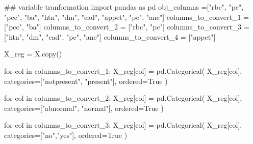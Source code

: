 \documentclass[
  11pt,
  letterpaper,
  DIV=11,
  numbers=noendperiod]{scrartcl}
\newenvironment{Shaded}{\begin{snugshade}}{\end{snugshade}}
\newcommand{\CommentTok}[1]{\textcolor[rgb]{0.37,0.37,0.37}{#1}}
\newcommand{\ControlFlowTok}[1]{\textcolor[rgb]{0.00,0.23,0.31}{#1}}
\newcommand{\ImportTok}[1]{\textcolor[rgb]{0.00,0.46,0.62}{#1}}
\newcommand{\KeywordTok}[1]{\textcolor[rgb]{0.00,0.23,0.31}{#1}}
\newcommand{\NormalTok}[1]{\textcolor[rgb]{0.00,0.23,0.31}{#1}}
\newcommand{\OperatorTok}[1]{\textcolor[rgb]{0.37,0.37,0.37}{#1}}
\newcommand{\StringTok}[1]{\textcolor[rgb]{0.13,0.47,0.30}{#1}}
\newcommand{\VariableTok}[1]{\textcolor[rgb]{0.07,0.07,0.07}{#1}}
\begin{document}
\begin{Shaded}
\begin{Highlighting}[]
\CommentTok{\#\# variable tranformation}
\ImportTok{import}\NormalTok{ pandas }\ImportTok{as}\NormalTok{ pd}
\NormalTok{obj\_columns }\OperatorTok{=}\NormalTok{[}\StringTok{"rbc"}\NormalTok{, }\StringTok{"pc"}\NormalTok{, }\StringTok{"pcc"}\NormalTok{, }\StringTok{"ba"}\NormalTok{, }\StringTok{"htn"}\NormalTok{, }\StringTok{"dm"}\NormalTok{, }\StringTok{"cad"}\NormalTok{, }\StringTok{"appet"}\NormalTok{, }\StringTok{"pe"}\NormalTok{, }\StringTok{"ane"}\NormalTok{]}
\NormalTok{columns\_to\_convert\_1 }\OperatorTok{=}\NormalTok{ [}\StringTok{"pcc"}\NormalTok{, }\StringTok{"ba"}\NormalTok{]}
\NormalTok{columns\_to\_convert\_2 }\OperatorTok{=}\NormalTok{ [}\StringTok{"rbc"}\NormalTok{, }\StringTok{"pc"}\NormalTok{]}
\NormalTok{columns\_to\_convert\_3 }\OperatorTok{=}\NormalTok{ [}\StringTok{"htn"}\NormalTok{, }\StringTok{"dm"}\NormalTok{, }\StringTok{"cad"}\NormalTok{, }\StringTok{"pe"}\NormalTok{, }\StringTok{"ane"}\NormalTok{]}
\NormalTok{columns\_to\_convert\_4 }\OperatorTok{=}\NormalTok{ [}\StringTok{"appet"}\NormalTok{]}

\NormalTok{X\_reg }\OperatorTok{=}\NormalTok{ X.copy()}

\ControlFlowTok{for}\NormalTok{ col }\KeywordTok{in}\NormalTok{ columns\_to\_convert\_1:}
\NormalTok{    X\_reg[col] }\OperatorTok{=}\NormalTok{ pd.Categorical(}
\NormalTok{        X\_reg[col], }
\NormalTok{        categories}\OperatorTok{=}\NormalTok{[}\StringTok{"notpresent"}\NormalTok{, }\StringTok{"present"}\NormalTok{], }
\NormalTok{        ordered}\OperatorTok{=}\VariableTok{True}
\NormalTok{    )}

\ControlFlowTok{for}\NormalTok{ col }\KeywordTok{in}\NormalTok{ columns\_to\_convert\_2:}
\NormalTok{    X\_reg[col] }\OperatorTok{=}\NormalTok{ pd.Categorical(}
\NormalTok{        X\_reg[col], }
\NormalTok{        categories}\OperatorTok{=}\NormalTok{[}\StringTok{"abnormal"}\NormalTok{, }\StringTok{"normal"}\NormalTok{], }
\NormalTok{        ordered}\OperatorTok{=}\VariableTok{True}
\NormalTok{    )}

\ControlFlowTok{for}\NormalTok{ col }\KeywordTok{in}\NormalTok{ columns\_to\_convert\_3:}
\NormalTok{    X\_reg[col] }\OperatorTok{=}\NormalTok{ pd.Categorical(}
\NormalTok{        X\_reg[col], }
\NormalTok{        categories}\OperatorTok{=}\NormalTok{[}\StringTok{"no"}\NormalTok{,}\StringTok{"yes"}\NormalTok{], }
\NormalTok{        ordered}\OperatorTok{=}\VariableTok{True}
\NormalTok{    )}


\end{Highlighting}
\end{Shaded}
\end{document}
